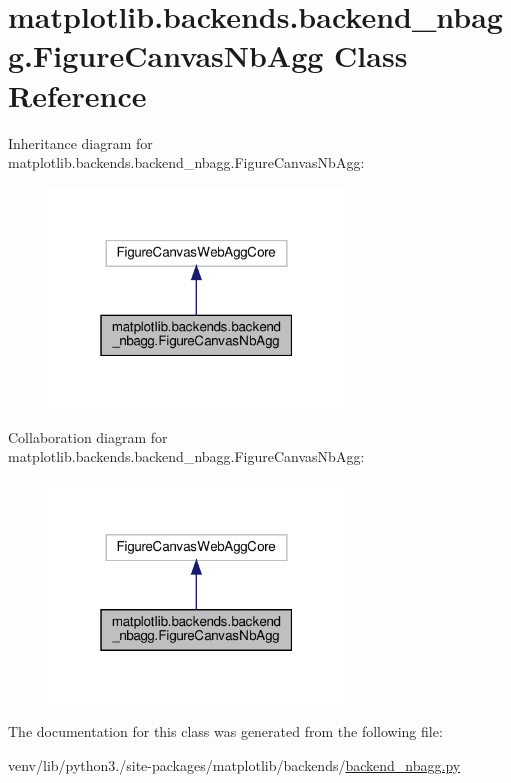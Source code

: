 \hypertarget{classmatplotlib_1_1backends_1_1backend__nbagg_1_1FigureCanvasNbAgg}{}\section{matplotlib.\+backends.\+backend\+\_\+nbagg.\+Figure\+Canvas\+Nb\+Agg Class Reference}
\label{classmatplotlib_1_1backends_1_1backend__nbagg_1_1FigureCanvasNbAgg}


Inheritance diagram for matplotlib.\+backends.\+backend\+\_\+nbagg.\+Figure\+Canvas\+Nb\+Agg\+:
\nopagebreak
\begin{figure}[H]
\begin{center}
\leavevmode
\includegraphics[width=223pt]{classmatplotlib_1_1backends_1_1backend__nbagg_1_1FigureCanvasNbAgg__inherit__graph}
\end{center}
\end{figure}


Collaboration diagram for matplotlib.\+backends.\+backend\+\_\+nbagg.\+Figure\+Canvas\+Nb\+Agg\+:
\nopagebreak
\begin{figure}[H]
\begin{center}
\leavevmode
\includegraphics[width=223pt]{classmatplotlib_1_1backends_1_1backend__nbagg_1_1FigureCanvasNbAgg__coll__graph}
\end{center}
\end{figure}


The documentation for this class was generated from the following file\+:\begin{DoxyCompactItemize}
\item 
venv/lib/python3./site-\/packages/matplotlib/backends/\hyperlink{backend__nbagg_8py}{backend\+\_\+nbagg.\+py}\end{DoxyCompactItemize}
